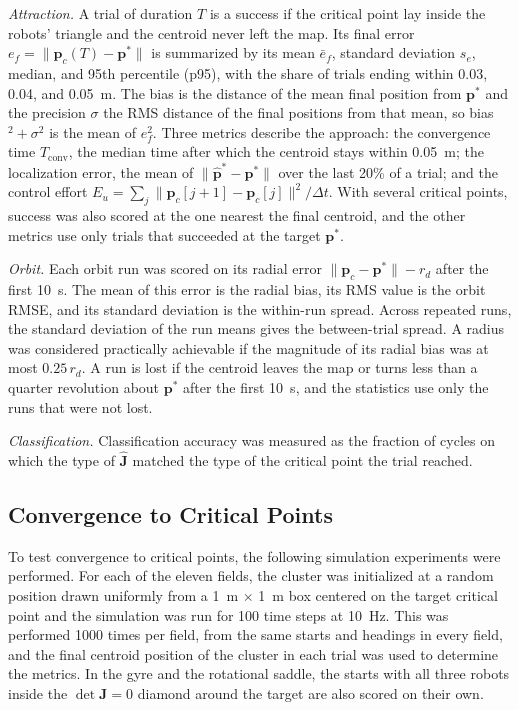 \documentclass[lettersize,journal]{IEEEtran}
\begin{document}
\emph{Attraction.} A trial of duration $T$ is a success if the critical point lay inside the robots' triangle and the centroid never left the map. Its final error $e_f = \|\mathbf{p}_c(T) - \mathbf{p}^*\|$ is summarized by its mean $\bar{e}_f$, standard deviation $s_e$, median, and 95th percentile (p95), with the share of trials ending within 0.03, 0.04, and 0.05~m. The bias is the distance of the mean final position from $\mathbf{p}^*$ and the precision $\sigma$ the RMS distance of the final positions from that mean, so bias$^2 + \sigma^2$ is the mean of $e_f^2$. Three metrics describe the approach: the convergence time $T_{\mathrm{conv}}$, the median time after which the centroid stays within 0.05~m; the localization error, the mean of $\|\hat{\mathbf{p}}^* - \mathbf{p}^*\|$ over the last 20\% of a trial; and the control effort $E_u = \sum_j \|\mathbf{p}_c[j+1] - \mathbf{p}_c[j]\|^2/\Delta t$. With several critical points, success was also scored at the one nearest the final centroid, and the other metrics use only trials that succeeded at the target $\mathbf{p}^*$.

\emph{Orbit.} Each orbit run was scored on its radial error $\|\mathbf{p}_c - \mathbf{p}^*\| - r_d$ after the first 10~s. The mean of this error is the radial bias, its RMS value is the orbit RMSE, and its standard deviation is the within-run spread. Across repeated runs, the standard deviation of the run means gives the between-trial spread. A radius was considered practically achievable if the magnitude of its radial bias was at most $0.25\,r_d$. A run is lost if the centroid leaves the map or turns less than a quarter revolution about $\mathbf{p}^*$ after the first 10~s, and the statistics use only the runs that were not lost.

\emph{Classification.} Classification accuracy was measured as the fraction of cycles on which the type of $\hat{\mathbf{J}}$ matched the type of the critical point the trial reached.

\subsection{Convergence to Critical Points}

To test convergence to critical points, the following simulation experiments were performed. For each of the eleven fields, the cluster was initialized at a random position drawn uniformly from a 1~m $\times$ 1~m box centered on the target critical point and the simulation was run for 100 time steps at 10~Hz. This was performed 1000 times per field, from the same starts and headings in every field, and the final centroid position of the cluster in each trial was used to determine the metrics. In the gyre and the rotational saddle, the starts with all three robots inside the $\det\mathbf{J} = 0$ diamond around the target are also scored on their own.
\end{document}
